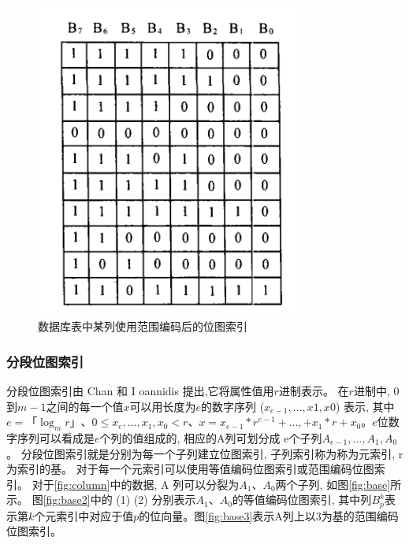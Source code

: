 \documentclass[11pt, a4paper]{article}
\begin{document}
  \begin{figure}[H]
    \centering
      \includegraphics[width=3.5in]{range.png}
      \caption{数据库表中某列使用范围编码后的位图索引}\label{fig:range}
  \end{figure}

  \subsubsection{分段位图索引}

  分段位图索引由 Chan 和 I oannidis 提出,它将属性值用$r$进制表示。 在$r$进制中, 0到$m - 1$之间的每一个值$x$可以用长度为$e$的数字序列 ($x_{e-1}, …, x1, x0$) 表示, 其中 $e =「\log_m{r}」$、$0≤x_e, …, x_1 , x_0 <r$、$x = x_{e - 1} *r^{e-1} +…, + x_1 *r + x_0$。$e$位数字序列可以看成是$e$个列的值组成的, 相应的A列可划分成 e个子列$A_{e-1}, …, A_1, A_0$。 分段位图索引就是分别为每一个子列建立位图索引, 子列索引称为称为元索引, r为索引的基。 对于每一个元索引可以使用等值编码位图索引或范围编码位图索引。 对于\ref{fig:column}中的数据, A 列可以分裂为$A_1 、A_0$两个子列, 如图\ref{fig:base}所示。 图\ref{fig:base2}中的 (1) (2) 分别表示$A_1$、$A_0$的等值编码位图索引, 其中列$B^k_p$表示第$k$个元索引中对应于值$p$的位向量。图\ref{fig:base3}表示A列上以3为基的范围编码位图索引。
\end{document}
